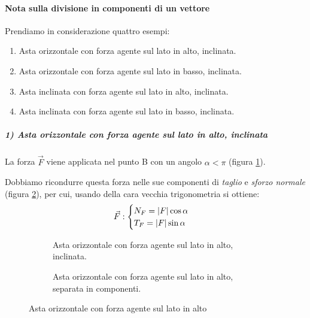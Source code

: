 \documentclass[main.tex]{subfiles}
\begin{document}
\paragraph{Nota sulla divisione in componenti di un vettore}
Prendiamo in considerazione quattro esempi:

\begin{enumerate}
	\item Asta orizzontale con forza agente sul lato in alto, inclinata.
	\item Asta orizzontale con forza agente sul lato in basso, inclinata.
	\item Asta inclinata con forza agente sul lato in alto, inclinata.
	\item Asta inclinata con forza agente sul lato in basso, inclinata.
\end{enumerate}

\subparagraph{1) Asta orizzontale con forza agente sul lato in alto, inclinata}
La forza $\vec{F}$ viene applicata nel punto B con un angolo $\alpha<\pi$ (figura \ref{asta_orizzontale_forza_inclinata_alto_intera}).

Dobbiamo ricondurre questa forza nelle sue componenti di \textit{taglio} e \textit{sforzo normale} (figura \ref{asta_orizzontale_forza_inclinata_alto_separata}), per cui, usando della cara vecchia trigonometria si ottiene:
\[
	\vec{F}: \begin{cases}
		N_F = \lvert F\rvert\cos{\alpha}\\
		T_F = \lvert F\rvert\sin{\alpha}
	\end{cases}
\]


\begin{figure}[!tbp]
  \begin{subfigure}[b]{.5\textwidth}
  \centering
  \resizebox{.5\textwidth}{!}{}
  \caption{Asta orizzontale con forza agente sul lato in alto, inclinata.}
  \label{asta_orizzontale_forza_inclinata_alto_intera}
  \end{subfigure}
  \hfill
  \begin{subfigure}[b]{.5\textwidth}
  \centering
  \resizebox{.5\textwidth}{!}{}
  \caption{Asta orizzontale con forza agente sul lato in alto, separata in componenti.}
  \label{asta_orizzontale_forza_inclinata_alto_separata}
  \end{subfigure}
  \caption{Asta orizzontale con forza agente sul lato in alto}
  \label{asta_orizzontale_forza_inclinata_alto}
\end{figure}
\end{document}

